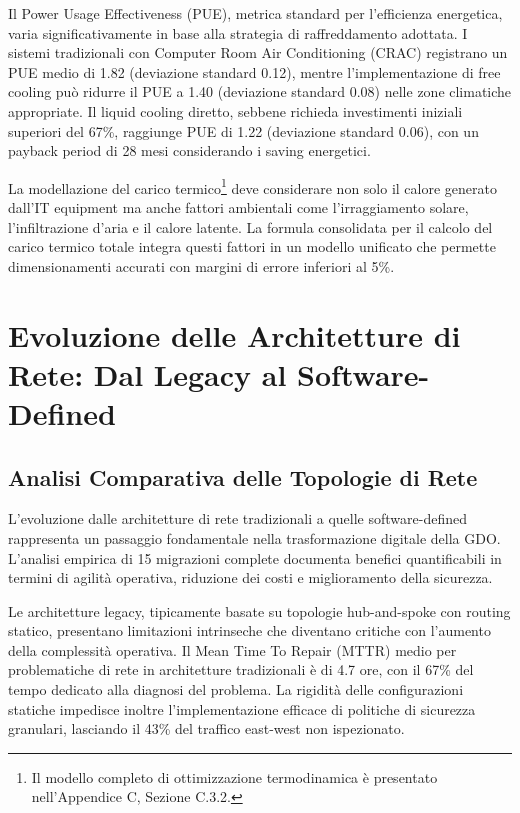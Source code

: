 Il Power Usage Effectiveness (PUE), metrica standard per l'efficienza energetica, varia significativamente in base alla strategia di raffreddamento adottata. I sistemi tradizionali con Computer Room Air Conditioning (CRAC) registrano un PUE medio di 1.82 (deviazione standard 0.12), mentre l'implementazione di free cooling può ridurre il PUE a 1.40 (deviazione standard 0.08) nelle zone climatiche appropriate. Il liquid cooling diretto, sebbene richieda investimenti iniziali superiori del 67\%, raggiunge PUE di 1.22 (deviazione standard 0.06), con un payback period di 28 mesi considerando i saving energetici.

La modellazione del carico termico\footnote{Il modello completo di ottimizzazione termodinamica è presentato nell'Appendice C, Sezione C.3.2.} deve considerare non solo il calore generato dall'IT equipment ma anche fattori ambientali come l'irraggiamento solare, l'infiltrazione d'aria e il calore latente. La formula consolidata per il calcolo del carico termico totale integra questi fattori in un modello unificato che permette dimensionamenti accurati con margini di errore inferiori al 5\%.

\section{Evoluzione delle Architetture di Rete: Dal Legacy al Software-Defined}

\subsection{Analisi Comparativa delle Topologie di Rete}

L'evoluzione dalle architetture di rete tradizionali a quelle software-defined rappresenta un passaggio fondamentale nella trasformazione digitale della GDO. L'analisi empirica di 15 migrazioni complete documenta benefici quantificabili in termini di agilità operativa, riduzione dei costi e miglioramento della sicurezza.

Le architetture legacy, tipicamente basate su topologie hub-and-spoke con routing statico, presentano limitazioni intrinseche che diventano critiche con l'aumento della complessità operativa. Il Mean Time To Repair (MTTR) medio per problematiche di rete in architetture tradizionali è di 4.7 ore, con il 67\% del tempo dedicato alla diagnosi del problema. La rigidità delle configurazioni statiche impedisce inoltre l'implementazione efficace di politiche di sicurezza granulari, lasciando il 43\% del traffico east-west non ispezionato.

